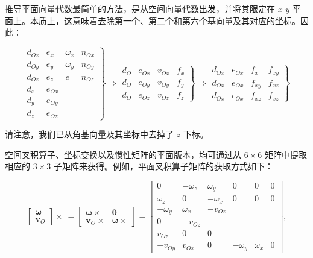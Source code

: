 \documentclass[10pt,a4paper]{book}
\theoremstyle{thmstyle} %
\theoremstyle{defstyle} %
\theoremstyle{prostyle} %
\begin{document}
推导平面向量代数最简单的方法，是从空间向量代数出发，并将其限定在 $x$-$y$ 平面上。本质上，这意味着去除第一个、第二个和第六个基向量及其对应的坐标。因此：



$$
\left. \begin{array}{llll} { { d _ { O x } } } & { { e _ { x } } } & { { \omega _ { x } } } & { { n _ { O x } } } \\{ { d _ { O y } } } & { { e _ { y } } } & { { \omega _ { y } } } & { { n _ { O y } } } \\{ { d _ { O z } } } & { { e _ { z } } } & { { e } } & { { n _ { O z } } } \\{ { d _ { x } } } & { { e _ { O x } } } \\{ { d _ { y } } } & { { e _ { O y } } } \\{ { d _ { z } } } & { { e _ { O z } } } \end{array} \right\} \Rightarrow \left. \begin{array}{llll} { { d _ { O } } } & { { e _ { O x } } } & { { v _ { O x } } } & { { f _ { x } } } \\{ { d _ { O } } } & { { e _ { O y } } } & { { v _ { O y } } } & { { f _ { y } } } \\{ { d _ { O } } } & { { e _ { O z } } } & { { v _ { O z } } } & { { f _ { z } } } \end{array} \right\} \Rightarrow \left. \begin{array}{llll} { { d _ { O x } } } & { { e _ { O x } } } & { { f _ { x } } } & { { f _ { x y } } } \\{ { d _ { O x } } } & { { e _ { O x } } } & { { f _ { x y } } } & { { f _ { x z } } } \\{ { d _ { O x } } } & { { e _ { O x } } } & { { f _ { x z } } } & { { f _ { x z } } } \end{array} \right\}
$$



请注意，我们已从角基向量及其坐标中去掉了 $z$ 下标。



空间叉积算子、坐标变换以及惯性矩阵的平面版本，均可通过从 $6 \times 6$ 矩阵中提取相应的 $3 \times 3$ 子矩阵来获得。例如，平面叉积算子矩阵的获取方式如下：



$$
\begin{bmatrix}\boldsymbol\omega\\\boldsymbol v_O\end{bmatrix}\times\:=\begin{bmatrix}\boldsymbol\omega\times&\boldsymbol0\\\boldsymbol v_O\times&\boldsymbol\omega\times\end{bmatrix}=\begin{bmatrix}0&-\omega_z&\omega_y&0&0&0\\\omega_z&0&-\omega_x&0&0&0\\-\omega_y&\omega_x&-v_{Oz}\\0&-v_{Oz}\\v_{Oz}&0&0\\-v_{Oy}&v_{Ox}&0&-\omega_y&\omega_x&0\end{bmatrix},
$$
\end{document}
